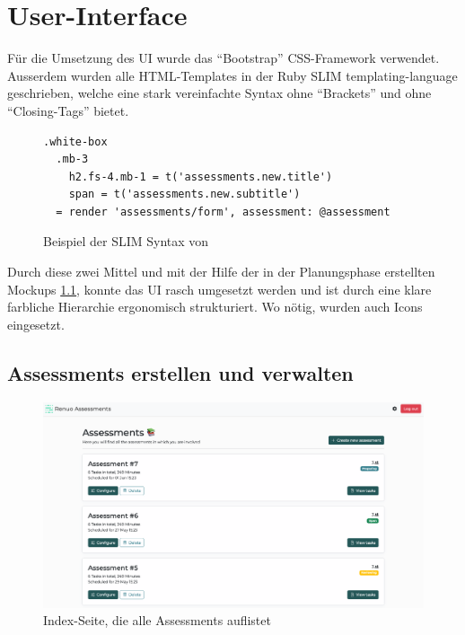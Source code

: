\section{User-Interface}

Für die Umsetzung des UI wurde das \enquote{Bootstrap} CSS-Framework verwendet. Ausserdem wurden alle
HTML-Templates in der Ruby SLIM templating-language geschrieben, 
welche eine stark vereinfachte Syntax ohne \enquote{Brackets} und ohne \enquote{Closing-Tags} bietet.

\begin{figure}[H]
\begin{codebox}
\begin{verbatim}
.white-box
  .mb-3
    h2.fs-4.mb-1 = t('assessments.new.title')
    span = t('assessments.new.subtitle')
  = render 'assessments/form', assessment: @assessment
\end{verbatim}
\end{codebox}
\caption{\label{fig:slim-example}Beispiel der SLIM Syntax von }
\end{figure}

Durch diese zwei Mittel und mit der Hilfe der in der Planungsphase erstellten Mockups \ref{}, konnte das UI
rasch umgesetzt werden und ist durch eine klare farbliche Hierarchie ergonomisch strukturiert. Wo nötig, wurden auch
Icons eingesetzt. 

\subsection{Assessments erstellen und verwalten}

\begin{figure}[H]
  \centering
  \includegraphics[width=14cm]{images/ui/assessments-index.png}
  \caption{\label{fig:assessments-index}Index-Seite, die alle Assessments auflistet}
\end{figure}

